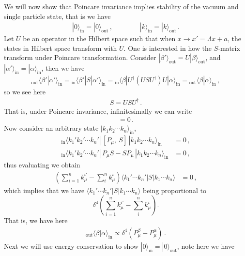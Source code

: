 \documentclass[11pt, onesided]{book}
\theoremstyle{break}
\theoremstyle{break}
\begin{document}
We will now show that Poincare invariance implies stability of the vacuum and single particle state, that is we have
\begin{align*}
|0\rangle_{\text{in}} = |0\rangle_{\text{out}}\,,\qquad\qquad 
|k\rangle_{\text{in}} = |k\rangle_{\text{out}}\,.
\end{align*}
Let $U$ be an operator in the Hilbert space such that when $x \to x' = \Lambda x +a$, the states in Hilbert space transform with $U$. One is interested in how the $S$-matrix transform under Poincare transformation. Consider $|\beta'\rangle_{\text{out}} = U |\beta\rangle_{\text{out}}$, and $|\alpha'\rangle_{\text{in}} =|\alpha\rangle_{\text{in}} $, then we have
\begin{align*}
{}_{\text{out}}\langle \beta' | \alpha'\rangle_{\text{in}} = {}_{\text{in}}\langle\beta'|S|\alpha'\rangle_{\text{in}} = {}_{\text{in}}\langle \beta |U^\dagger(USU^\dagger)U |\alpha\rangle_{\text{in}} = {}_{\text{out}}\langle \beta | \alpha\rangle_{\text{in}}\,,
\end{align*}
so we see here
\begin{align*}
S = USU^\dagger\,.
\end{align*}
That is, under Poincare invariance, infinitesimally we can write
\begin{align*}
[P^\mu,\ S] = 0\,.
\end{align*}
Now consider an arbitrary state $|k_1k_2\cdots k_n\rangle_{\text{in}}$,
\begin{align*}
{}_\text{in}\langle k_1' k_2'\cdots k_n'| \, [P_{\mu},\ S]\, | k_1k_2\cdots k_n\rangle_{\text{in}} &= 0 \,, \\
{}_\text{in}\langle k_1' k_2'\cdots k_n'| \, P_\mu S- SP_\mu\, | k_1k_2\cdots k_n\rangle_{\text{in}} &= 0\,,
\end{align*}
thus evaluating we obtain
\begin{align*}
\left(\sum_{i=1}^n k_\mu^{i'} - \sum_{i}^n k_\mu^i \right) \langle k_1'\cdots k_n' | S | k_1 \cdots k_n\rangle &=0\,,
\end{align*}
which implies that we have
$\langle k_1'\cdots k_n' | S | k_1 \cdots k_n\rangle$
being proportional to 
$$\delta^4\left(\sum_{i=1}^n k_\mu^{i'} - \sum_{i}^n k_\mu^i\right).$$ 
That is, we have here
\begin{align*}
{}_{\text{out}}\langle \beta |\alpha \rangle_{\text{in}}\propto \delta^4(P^\beta_\mu - P^\alpha_\mu)\,.
\end{align*}
Next we will use energy conservation to show $|0\rangle_{\text{in}} = |0\rangle_{\text{out}}$, note here we have
\end{document}
